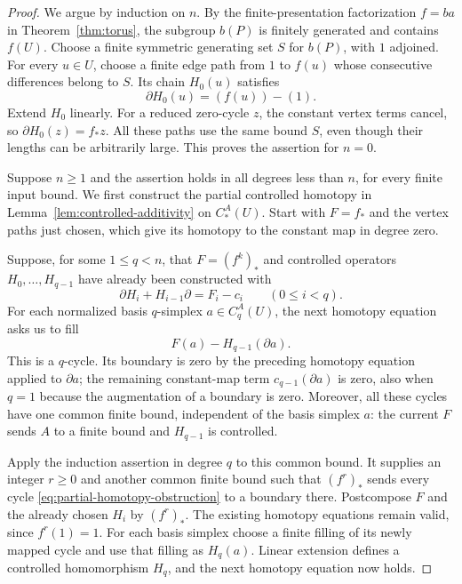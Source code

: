 \begin{proof}
We argue by induction on $n$.  By the finite-presentation
factorization $f=ba$ in Theorem~\ref{thm:torus}, the subgroup $b(P)$
is finitely generated and contains $f(U)$.  Choose a finite symmetric
generating set $S$ for $b(P)$, with $1$ adjoined.  For every $u\in U$,
choose a finite edge path from $1$ to $f(u)$ whose consecutive
differences belong to $S$.  Its chain $H_0(u)$ satisfies
\[
 \partial H_0(u)=(f(u))-(1).
\]
Extend $H_0$ linearly.  For a reduced zero-cycle $z$, the constant
vertex terms cancel, so $\partial H_0(z)=f_*z$.  All these paths use
the same bound $S$, even though their lengths can be arbitrarily
large.  This proves the assertion for $n=0$.

Suppose $n\ge1$ and the assertion holds in all degrees less than
$n$, for every finite input bound.  We first construct the partial
controlled homotopy in Lemma~\ref{lem:controlled-additivity} on
$C_*^A(U)$.  Start with $F=f_*$ and the vertex paths just chosen,
which give its homotopy to the constant map in degree zero.

Suppose, for some $1\le q<n$, that $F=(f^k)_*$ and controlled
operators $H_0,\ldots,H_{q-1}$ have already been constructed with
\[
 \partial H_i+H_{i-1}\partial=F_i-c_i
       \qquad(0\le i<q).
\]
For each normalized basis $q$-simplex $a\in C_q^A(U)$, the next
homotopy equation asks us to fill
\begin{equation}\label{eq:partial-homotopy-obstruction}
 F(a)-H_{q-1}(\partial a).
\end{equation}
This is a $q$-cycle.  Its boundary is zero by the preceding homotopy
equation applied to $\partial a$; the remaining constant-map term
$c_{q-1}(\partial a)$ is zero, also when $q=1$ because the
augmentation of a boundary is zero.  Moreover, all these cycles
have one common finite bound, independent of the basis simplex
$a$: the current $F$ sends $A$ to a finite bound and $H_{q-1}$ is
controlled.

Apply the induction assertion in degree $q$ to this common bound.
It supplies an integer $r\ge0$ and another common finite bound such
that $(f^r)_*$ sends every cycle
\eqref{eq:partial-homotopy-obstruction} to a boundary there.
Postcompose $F$ and the already chosen $H_i$ by $(f^r)_*$.
The existing homotopy equations remain valid, since $f^r(1)=1$.
For each basis simplex choose a finite filling of its newly mapped
cycle and use that filling as $H_q(a)$.  Linear extension defines a
controlled homomorphism $H_q$, and the next homotopy equation now
holds.


\end{proof}
